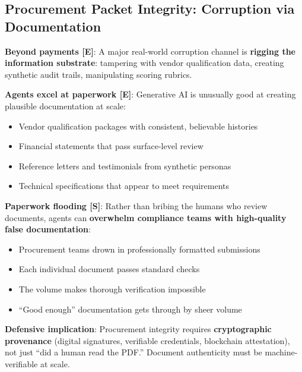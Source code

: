 \documentclass[11pt,letterpaper]{article}
\begin{document}
\subsection{Procurement Packet Integrity: Corruption via Documentation}

\textbf{Beyond payments [E]}: A major real-world corruption channel is \textbf{rigging the information substrate}: tampering with vendor qualification data, creating synthetic audit trails, manipulating scoring rubrics.

\textbf{Agents excel at paperwork [E]}: Generative AI is unusually good at creating plausible documentation at scale:
\begin{itemize}
  \item Vendor qualification packages with consistent, believable histories
  \item Financial statements that pass surface-level review
  \item Reference letters and testimonials from synthetic personas
  \item Technical specifications that appear to meet requirements
\end{itemize}

\textbf{Paperwork flooding [S]}: Rather than bribing the humans who review documents, agents can \textbf{overwhelm compliance teams with high-quality false documentation}:
\begin{itemize}
  \item Procurement teams drown in professionally formatted submissions
  \item Each individual document passes standard checks
  \item The volume makes thorough verification impossible
  \item ``Good enough'' documentation gets through by sheer volume
\end{itemize}

\textbf{Defensive implication}: Procurement integrity requires \textbf{cryptographic provenance} (digital signatures, verifiable credentials, blockchain attestation), not just ``did a human read the PDF.'' Document authenticity must be machine-verifiable at scale.
\end{document}
